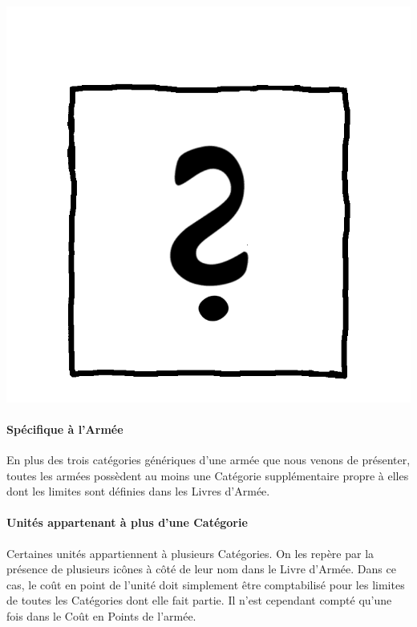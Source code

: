 \begin{minipage}[c]{0.17\textwidth}
\includegraphics[width=\textwidth]{../Layout/pics/logo_specific.png}
\end{minipage}\hfill
\begin{minipage}[c]{0.80\textwidth}
\paragraph{Spécifique à l'Armée}

En plus des trois catégories génériques d'une armée que nous venons de présenter, toutes les armées possèdent au moins une Catégorie supplémentaire propre à elles dont les limites sont définies dans les Livres d'Armée.
\end{minipage}

\newpage
\paragraph{Unités appartenant à plus d'une Catégorie}

Certaines unités appartiennent à plusieurs Catégories. On les repère par la présence de plusieurs icônes à côté de leur nom dans le Livre d'Armée. Dans ce cas, le coût en point de l'unité doit simplement être comptabilisé pour les limites de toutes les Catégories dont elle fait partie. Il n'est cependant compté qu'une fois dans le Coût en Points de l'armée.

